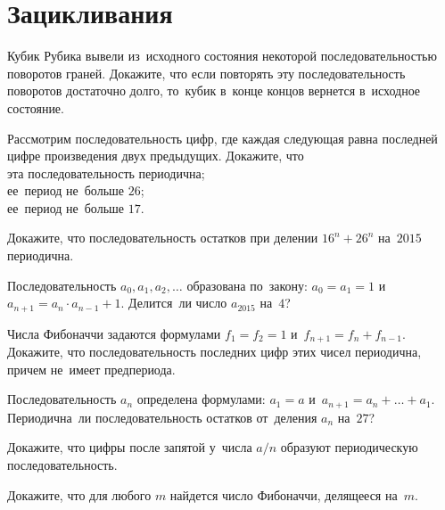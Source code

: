
\section*{Зацикливания}


\begin{problems}

\item
Кубик Рубика вывели из~исходного состояния некоторой последовательностью
поворотов граней.
Докажите, что если повторять эту последовательность поворотов достаточно долго,
то~кубик в~конце концов вернется в~исходное состояние.

\item
Рассмотрим последовательность цифр, где каждая следующая равна последней цифре
произведения двух предыдущих.
Докажите, что
\\
\sp эта последовательность периодична;
\\
\sp ее~период не~больше $26$;
\\
\sp ее~период не~больше $17$.

\item
Докажите, что последовательность остатков при делении $16^n + 26^n$ на~$2015$
периодична.

\item
Последовательность $a_0, a_1, a_2,\ldots$ образована по~закону:
$a_0 = a_1 = 1$ и~ $a_{n + 1} = a_n \cdot a_{n - 1} + 1$.
Делится~ли число $a_{2015}$ на~$4$?

\item
Числа Фибоначчи задаются формулами
$f_1 = f_2 = 1$ и~$f_{n + 1} = f_n + f_{n - 1}$.
Докажите, что последовательность последних цифр этих чисел периодична, причем
не~имеет предпериода.

\item
Последовательность $a_n$ определена формулами:
$a_1 = a$ и~$a_{n + 1} = a_n + \ldots + a_1$.
Периодична~ли последовательность остатков от~деления $a_n$ на~$27$?

\item
Докажите, что цифры после запятой у~числа $a / n$ образуют периодическую
последовательность.

\item
Докажите, что для любого $m$ найдется число Фибоначчи, делящееся на~$m$.

\end{problems}

